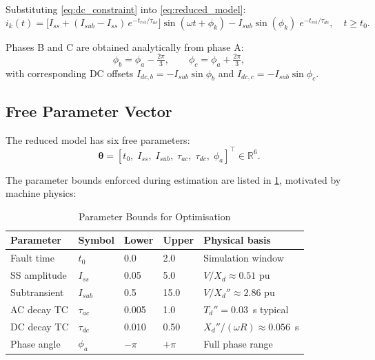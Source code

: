 \documentclass[12pt, a4paper]{article}
\theoremstyle{definition}
\theoremstyle{plain}
\newcommand{\vect}[1]{\bm{#1}}
\newcommand{\tr}{^\top}
\begin{document}
\noindent
Substituting \cref{eq:dc_constraint} into \cref{eq:reduced_model}:
\begin{equation}
  i_k(t) = \bigl[I_{ss} + (I_{sub} - I_{ss})\,e^{-t_{rel}/\tau_{ac}}\bigr]
            \sin(\omega t + \phi_k)
          - I_{sub}\sin(\phi_k)\;e^{-t_{rel}/\tau_{dc}},
  \quad t \geq t_0.
  \label{eq:reduced_model_final}
\end{equation}

Phases B and C are obtained analytically from phase A:
\begin{equation}
  \phi_b = \phi_a - \tfrac{2\pi}{3}, \qquad
  \phi_c = \phi_a + \tfrac{2\pi}{3},
  \label{eq:phase_angles}
\end{equation}
with corresponding DC offsets $I_{dc,b} = -I_{sub}\sin\phi_b$ and
$I_{dc,c} = -I_{sub}\sin\phi_c$.

\subsection{Free Parameter Vector}
\label{sec:model:params}

The reduced model has six free parameters:
\begin{equation}
  \vect{\theta} = [t_0,\; I_{ss},\; I_{sub},\; \tau_{ac},\; \tau_{dc},\; \phi_a]\tr
  \in \mathbb{R}^6.
  \label{eq:theta}
\end{equation}

The parameter bounds enforced during estimation are listed in
\cref{tab:bounds}, motivated by machine physics:
\begin{table}[h]
\centering
\caption{Parameter Bounds for Optimisation}
\label{tab:bounds}
\begin{tabular}{lllll}
\toprule
\textbf{Parameter} & \textbf{Symbol} & \textbf{Lower} & \textbf{Upper}
  & \textbf{Physical basis} \\
\midrule
Fault time     & $t_0$      & 0.0     & 2.0    & Simulation window \\
SS amplitude   & $I_{ss}$   & 0.05    & 5.0    & $V/X_d \approx 0.51$ pu \\
Subtransient   & $I_{sub}$  & 0.5     & 15.0   & $V/X_d'' \approx 2.86$ pu \\
AC decay TC    & $\tau_{ac}$& 0.005   & 1.0    & $T_d'' = 0.03$~s typical \\
DC decay TC    & $\tau_{dc}$& 0.010   & 0.50   & $X_d''/(\omega R) \approx 0.056$~s \\
Phase angle    & $\phi_a$   & $-\pi$  & $+\pi$ & Full phase range \\
\bottomrule
\end{tabular}
\end{table}
\end{document}

